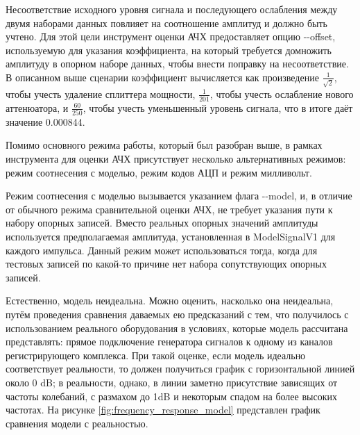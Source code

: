 \documentclass{report}
\begin{document}

Несоответствие исходного уровня сигнала и последующего ослабления между двумя наборами данных повлияет на соотношение амплитуд и должно быть учтено. Для этой цели инструмент оценки АЧХ предоставляет опцию -{}-offset, используемую для указания коэффициента, на который требуется домножить амплитуду в опорном наборе данных, чтобы внести поправку на несоответствие. В описанном выше сценарии коэффициент вычисляется как произведение $\frac{1}{\sqrt{2}}$, чтобы учесть удаление сплиттера мощности, $\frac{1}{201}$, чтобы учесть ослабление нового аттенюатора, и $\frac{60}{250}$, чтобы учесть уменьшенный уровень сигнала, что в итоге даёт значение 0.000844.

Помимо основного режима работы, который был разобран выше, в рамках инструмента для оценки АЧХ присутствует несколько альтернативных режимов: режим соотнесения с моделью, режим кодов АЦП и режим милливольт.

Режим соотнесения с моделью вызывается указанием флага -{}-model, и, в отличие от обычного режима сравнительной оценки АЧХ, не требует указания пути к набору опорных записей. Вместо реальных опорных значений амплитуды используется предполагаемая амплитуда, установленная в ModelSignalV1 для каждого импульса. Данный режим может использоваться тогда, когда для тестовых записей по какой-то причине нет набора сопутствующих опорных записей.

Естественно, модель неидеальна. Можно оценить, насколько она неидеальна, путём проведения сравнения даваемых ею предсказаний с тем, что получилось с использованием реального оборудования в условиях, которые модель рассчитана представлять: прямое подключение генератора сигналов к одному из каналов регистрирующего комплекса. При такой оценке, если модель идеально соответствует реальности, то должен получиться график с горизонтальной линией около 0 dB; в реальности, однако, в линии заметно присутствие зависящих от частоты колебаний, с размахом до 1dB и некоторым спадом на более высоких частотах. На рисунке \ref{fig:frequency_response_model} представлен график сравнения модели с реальностью.

\end{document}
